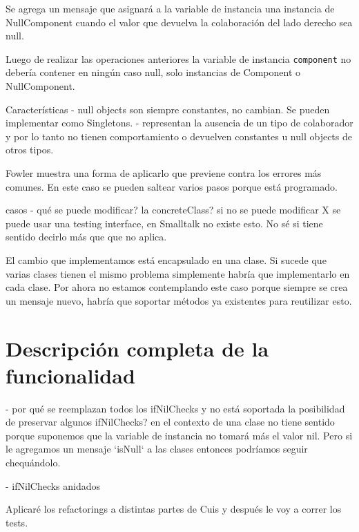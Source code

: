 Se agrega un mensaje que asignará a la variable de instancia una instancia de NullComponent cuando
el valor que devuelva la colaboración del lado derecho sea null.

Luego de realizar las operaciones anteriores la variable de instancia \lstinline{component} no
debería contener en ningún caso null, solo instancias de Component o NullComponent.



Características
- null objects son siempre constantes, no cambian. Se pueden implementar como Singletons.
- representan la ausencia de un tipo de colaborador y por lo tanto no tienen comportamiento o devuelven
constantes u null objects de otros tipos.


Fowler muestra una forma de aplicarlo que previene contra los errores más comunes. En este caso se pueden
saltear varios pasos porque está programado.

casos
- qué se puede modificar? la concreteClass? 
si no se puede modificar X se puede usar una testing interface, en Smalltalk no existe esto. No sé
si tiene sentido decirlo más que que no aplica.



El cambio que implementamos está encapsulado en una clase. Si sucede que varias clases tienen el mismo
problema simplemente habría que implementarlo en cada clase. Por ahora no estamos contemplando este caso
porque siempre se crea un mensaje nuevo, habría que soportar métodos ya existentes para reutilizar esto.



\section{Descripción completa de la funcionalidad}











- por qué se reemplazan todos los ifNilChecks y no está soportada la posibilidad de preservar algunos ifNilChecks? 
en el contexto de una clase no tiene sentido porque suponemos que la variable de instancia no
tomará más el valor nil. Pero si le agregamos un mensaje `isNull` a las clases entonces
podríamos seguir chequándolo. 

- ifNilChecks anidados

Aplicaré los refactorings a distintas partes de Cuis y después le voy a correr los tests.